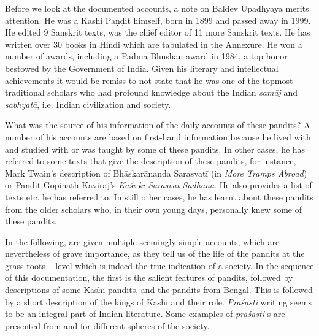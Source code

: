 Before we look at the documented accounts, a note on Baldev Upadhyaya merits attention. He was a Kashi Paṇḍit himself, born in 1899 and passed away in 1999. He edited 9 Sanskrit texts, was the chief editor of 11 more Sanskrit texts. He has written over 30 books in Hindi which are tabulated in the Annexure. He won a number of awards, including a Padma Bhushan award in 1984, a top honor bestowed by the Government of India. Given his literary and intellectual achievements it would be remiss to not state that he was one of the topmost traditional scholars who had profound knowledge about the Indian \textit{samāj} and \textit{sabhyatā}, i.e. Indian civilization and society.

What was the source of his information of the daily accounts of these pandits? A number of his accounts are based on first-hand information because he lived with and studied with or was taught by some of these pandits. In other cases, he has referred to some texts that give the description of these pandits, for instance, Mark Twain’s description of Bhāskarānanda Sarasvatī (in \textit{More Tramps Abroad}) or Pandit Gopinath Kaviraj’s \textit{Kāśī kī Sārasvat Sādhanā}. He also provides a list of texts etc. he has referred to. In still other cases, he has learnt about these pandits from the older scholars who, in their own young days, personally knew some of these pandits.

In the following, are given multiple seemingly simple accounts, which are nevertheless of grave importance, as they tell us of the life of the pandits at the grass-roots – level which is indeed the true indication of a society. In the sequence of this documentation, the first is the salient features of pandits, followed by descriptions of some Kashi pandits, and the pandits from Bengal. This is followed by a short description of the kings of Kashi and their role. \textit{Praśasti} writing seems to be an integral part of Indian literature. Some examples of \textit{praśasti}-s are presented from and for different spheres of the society.


